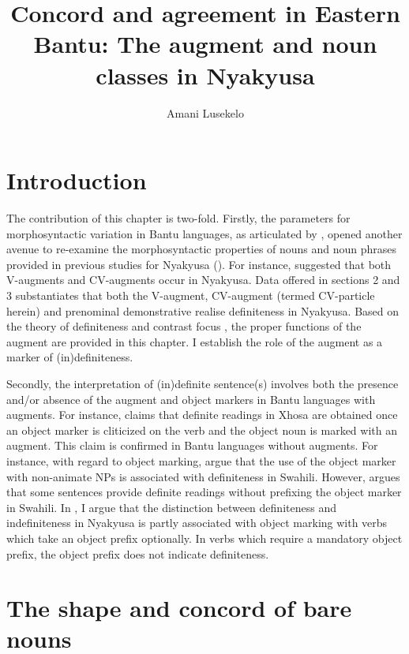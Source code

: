 \documentclass[output=paper]{langscibook}
\author{Amani Lusekelo\orcid{0000-0001-6275-237X}\affiliation{University of Dar es Salaam}}
\title[Concord and agreement in Eastern Bantu]{Concord and agreement in Eastern Bantu: The augment and noun classes in Nyakyusa}
\begin{document}
\maketitle 

\settowidth{}

\section{Introduction}\label{sec:lusekelo:1}  %
\largerpage
The contribution of this chapter is two-fold. Firstly, the parameters for morphosyntactic variation in Bantu languages, as articulated by \citet{GuéroisEtAl2017}, opened another avenue to re-examine the morphosyntactic properties of nouns and noun phrases provided in previous studies for Nyakyusa (\citealt{DeBlois1970, Lusekelo2009, Mbope2016, Persohn2017}). For instance, \citet{DeBlois1970} suggested that both V-aug\-ments and CV-aug\-ments occur in Nyakyusa. Data offered in sections 2 and 3 substantiates that both the V-aug\-ment, CV-aug\-ment (termed CV-particle herein) and prenominal demonstrative realise definiteness in Nyakyusa. Based on the theory of definiteness \citep{Lyons1999} and contrast focus \citep{Repp2010}, the proper functions of the augment are provided in this chapter. I establish the role of the augment as a marker of (in)definiteness. 

Secondly, the interpretation of (in)definite sentence(s) involves both the presence and/or absence of the augment and object markers in Bantu languages with augments. For instance, \citet{Visser2010} claims that definite readings in Xhosa are obtained once an object marker is cliticized on the verb and the object noun is marked with an augment. This claim is confirmed in Bantu languages without augments. For instance, with regard to object marking, \citet{MartenKula2012} argue that the use of the object marker with non-animate NPs is associated with definiteness in Swahili. However, \citet{Riedel2009} argues that some sentences provide definite readings without prefixing the object marker in Swahili. In , I argue that the distinction between definiteness and indefiniteness in Nyakyusa is partly associated with object marking with verbs which take an object prefix optionally. In verbs which require a mandatory object prefix, the object prefix does not indicate definiteness. 

\section{The shape and concord of bare nouns}\label{sec:lusekelo:2}  %
\end{document}
